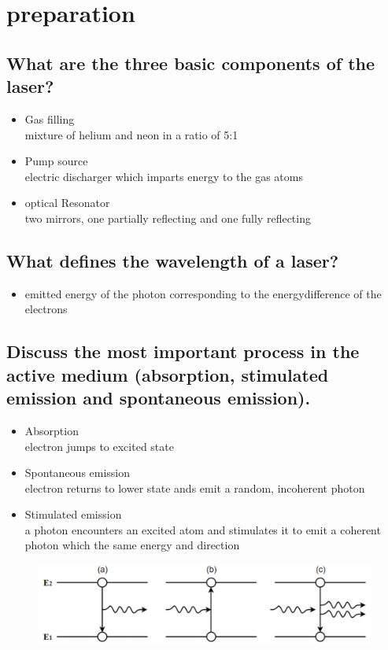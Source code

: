 \section{preparation}
\subsection{What are the three basic components of the laser?}
\begin{itemize}
    \item Gas filling \\
    \to mixture of helium and neon in a ratio of 5:1
    \item Pump source \\
    \to electric discharger which imparts energy to the gas atoms
    \item optical Resonator \\
    \to two mirrors, one partially reflecting and one fully reflecting
\end{itemize}
\subsection{What defines the wavelength of a laser?}
\begin{itemize}
    \item emitted energy of the photon corresponding to the energydifference 
    of the electrons
\end{itemize}
\subsection{Discuss the most important process in the active medium 
(absorption, stimulated emission and spontaneous emission).}
\begin{itemize}
    \item Absorption \\
    \to electron jumps to excited state 
    \item Spontaneous emission \\
    \to electron returns to lower state ands emit a random, incoherent photon
    \item Stimulated emission \\
    \to a photon encounters an excited atom and stimulates it to emit a coherent 
    photon which the same energy and direction
\end{itemize}
\begin{figure}
    \centering
    \includegraphics{pictures/emission.png}
\end{figure}

